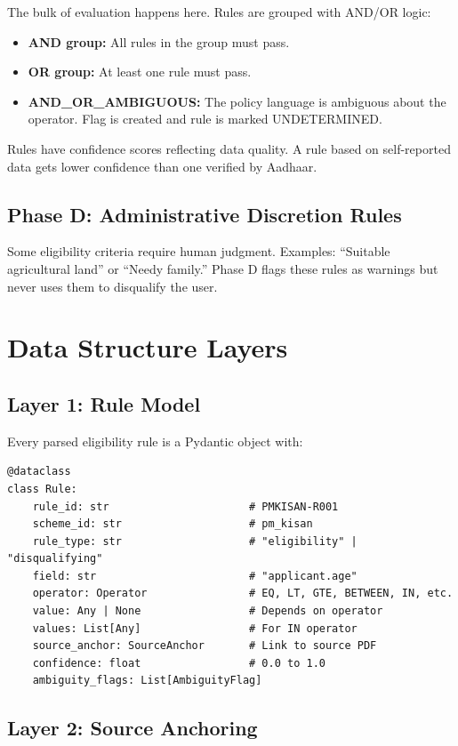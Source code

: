 \documentclass[11pt,a4paper]{report}
\begin{document}
The bulk of evaluation happens here. Rules are grouped with AND/OR logic:
\begin{itemize}
  \item \textbf{AND group:} All rules in the group must pass.
  \item \textbf{OR group:} At least one rule must pass.
  \item \textbf{AND\_OR\_AMBIGUOUS:} The policy language is ambiguous about the operator. Flag is created and rule is marked UNDETERMINED.
\end{itemize}

Rules have confidence scores reflecting data quality. A rule based on self-reported data gets lower confidence than one verified by Aadhaar.

\subsection{Phase D: Administrative Discretion Rules}

Some eligibility criteria require human judgment. Examples: ``Suitable agricultural land'' or ``Needy family.'' Phase D flags these rules as warnings but never uses them to disqualify the user.

\section{Data Structure Layers}

\subsection{Layer 1: Rule Model}

Every parsed eligibility rule is a Pydantic object with:

\begin{lstlisting}
@dataclass
class Rule:
    rule_id: str                      # PMKISAN-R001
    scheme_id: str                    # pm_kisan
    rule_type: str                    # "eligibility" | "disqualifying"
    field: str                        # "applicant.age"
    operator: Operator                # EQ, LT, GTE, BETWEEN, IN, etc.
    value: Any | None                 # Depends on operator
    values: List[Any]                 # For IN operator
    source_anchor: SourceAnchor       # Link to source PDF
    confidence: float                 # 0.0 to 1.0
    ambiguity_flags: List[AmbiguityFlag]
\end{lstlisting}

\subsection{Layer 2: Source Anchoring}
\end{document}
